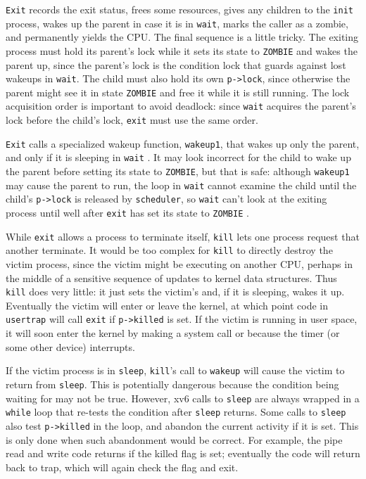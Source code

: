 \lstinline{Exit}
records the exit status, frees some resources,
gives any children to the \lstinline{init} process,
wakes up the parent in case it is in \lstinline{wait},
marks the caller as a zombie, and permanently
yields the CPU.
The final sequence is a little tricky.
The exiting process must hold its parent's lock while
it sets its state to \lstinline{ZOMBIE} and
wakes the parent up, since the parent's lock
is the condition lock
that guards against lost wakeups in \lstinline{wait}. The child must also
hold its own \lstinline{p->lock}, since otherwise the parent
might see it in state \lstinline{ZOMBIE} and free it while
it is still running.
The lock acquisition order is important to avoid deadlock: since \lstinline{wait}
acquires the parent's lock before the child's lock,
\lstinline{exit} must use the same order.

\lstinline{Exit} calls a specialized wakeup function,
\lstinline{wakeup1}, that wakes up only the parent,
and only if it is sleeping in 
\lstinline{wait}
.
It may look incorrect for the child to wake up the parent
before setting its state to \lstinline{ZOMBIE}, 
but that is safe:
although
\lstinline{wakeup1}
may cause the parent to run,
the loop in
\lstinline{wait}
cannot examine the child until the child's
\lstinline{p->lock}
is released by {\tt scheduler},
so
\lstinline{wait}
can't look at
the exiting process until well after
\lstinline{exit}
has set its state to
\lstinline{ZOMBIE}
.

While
\lstinline{exit} 
allows a process to terminate itself,
\lstinline{kill}
lets one process request that another terminate.
It would be too complex for
\lstinline{kill}
to directly destroy the victim process, since the victim
might be executing on another CPU, perhaps
in the middle of a sensitive sequence of updates to kernel data structures.
Thus
\lstinline{kill}
does very little: it just sets the victim's
and, if it is sleeping, wakes it up.
Eventually the victim will enter or leave the kernel,
at which point code in
\lstinline{usertrap}
will call
\lstinline{exit}
if
\lstinline{p->killed}
is set.
If the victim is running in user space, it will soon enter
the kernel by making a system call or because the timer (or
some other device) interrupts.

If the victim process is in
\lstinline{sleep},
\lstinline{kill}'s call to
\lstinline{wakeup}
will cause the victim to return from
\lstinline{sleep}.
This is potentially dangerous because 
the condition being waiting for may not be true.
However, xv6 calls to
\lstinline{sleep}
are always wrapped in a
\lstinline{while}
loop that re-tests the condition after
\lstinline{sleep}
returns.
Some calls to
\lstinline{sleep}
also test
\lstinline{p->killed}
in the loop, and abandon the current activity if it is set.
This is only done when such abandonment would be correct.
For example, the pipe read and write code
returns if the killed flag is set; eventually the
code will return back to trap, which will again
check the flag and exit.

